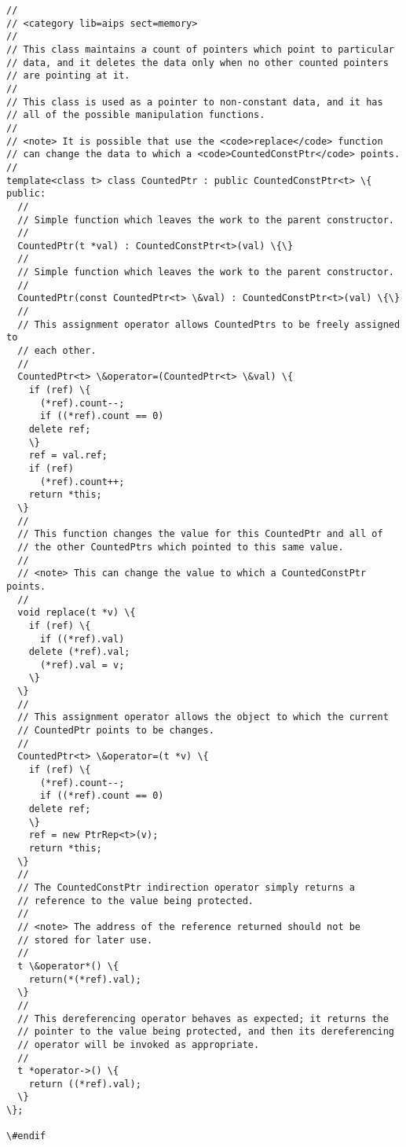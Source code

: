 \begin{verbatim}
//
// <category lib=aips sect=memory>
//
// This class maintains a count of pointers which point to particular
// data, and it deletes the data only when no other counted pointers 
// are pointing at it.
//
// This class is used as a pointer to non-constant data, and it has
// all of the possible manipulation functions.
//
// <note> It is possible that use the <code>replace</code> function
// can change the data to which a <code>CountedConstPtr</code> points.
//
template<class t> class CountedPtr : public CountedConstPtr<t> \{
public:
  //
  // Simple function which leaves the work to the parent constructor.
  //
  CountedPtr(t *val) : CountedConstPtr<t>(val) \{\}
  //
  // Simple function which leaves the work to the parent constructor.
  //
  CountedPtr(const CountedPtr<t> \&val) : CountedConstPtr<t>(val) \{\}
  //
  // This assignment operator allows CountedPtrs to be freely assigned to
  // each other.
  //
  CountedPtr<t> \&operator=(CountedPtr<t> \&val) \{
    if (ref) \{
      (*ref).count--;
      if ((*ref).count == 0)
	delete ref;
    \}
    ref = val.ref;
    if (ref)
      (*ref).count++;
    return *this;
  \}
  //
  // This function changes the value for this CountedPtr and all of
  // the other CountedPtrs which pointed to this same value.
  //
  // <note> This can change the value to which a CountedConstPtr points.
  //
  void replace(t *v) \{
    if (ref) \{
      if ((*ref).val)
	delete (*ref).val;
      (*ref).val = v;
    \}
  \}
  //
  // This assignment operator allows the object to which the current
  // CountedPtr points to be changes.
  //
  CountedPtr<t> \&operator=(t *v) \{
    if (ref) \{
      (*ref).count--;
      if ((*ref).count == 0)
	delete ref;
    \}
    ref = new PtrRep<t>(v);
    return *this;
  \}
  //
  // The CountedConstPtr indirection operator simply returns a
  // reference to the value being protected.
  //
  // <note> The address of the reference returned should not be
  // stored for later use.
  //
  t \&operator*() \{
    return(*(*ref).val);
  \}
  //
  // This dereferencing operator behaves as expected; it returns the
  // pointer to the value being protected, and then its dereferencing
  // operator will be invoked as appropriate.
  //
  t *operator->() \{
    return ((*ref).val);
  \}
\};

\#endif
\end{verbatim}

